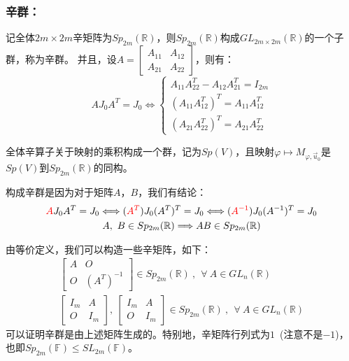 \documentclass[zihao=-4,UTF8]{report}
\theoremstyle{mystyle} %
\begin{document}
\subsubsection{辛群：}
记全体$2m\times 2m$辛矩阵为$Sp_{2m}(\mathbb{R})$，则$Sp_{2m}(\mathbb{R})$构成$GL_{2m\times 2m}(\mathbb{R})$的一个子群，称为辛群。
并且，设$A = \begin{bmatrix}
    A_{11}&A_{12}\\
    A_{21}&A_{22}
\end{bmatrix}$，则有：
\begin{equation*}
    AJ_0A^T = J_0  \Longleftrightarrow \begin{cases}
        A_{11}A_{22}^T - A_{12}A_{21}^T = I_{2m}\\
        (A_{11}A_{12}^T)^T = A_{11}A_{12}^T\\
        (A_{21}A_{22}^T)^T = A_{21}A_{22}^T
    \end{cases}
\end{equation*}\par
全体辛算子关于映射的乘积构成一个群，记为$Sp(V)$，且映射$\varphi \longmapsto M_{\varphi,\vec{u}_0}$是$Sp(V)$到$Sp_{2m}(\mathbb{R})$的同构。
{\par\color{gray}\small
构成辛群是因为对于矩阵$A$，$B$，我们有结论：
\begin{gather*}
    \textcolor{red}{A}J_0A^T = J_0 \Longleftrightarrow (\textcolor{red}{A^T})J_0(A^T)^T = J_0 \Longleftrightarrow (\textcolor{red}{A^{-1}})J_0(A^{-1})^T = J_0\\
    A,\ B \in Sp_{2m}(\mathbb{R})\Longrightarrow AB \in Sp_{2m}(\mathbb{R})
\end{gather*}\par 
\par}
{\par\color{gray}\small
由等价定义，我们可以构造一些辛矩阵，如下：
\begin{gather*}
    \begin{bmatrix}
        A  & O\\
        O & (A^T)^{-1}
    \end{bmatrix} \in Sp_{2m}(\mathbb{R})\ ,\ \  \forall\ A \in GL_n(\mathbb{R})\\
    \begin{bmatrix}
        I_m & A\\
        O & I_m
    \end{bmatrix},\ 
    \begin{bmatrix}
        I_m & A\\
        O & I_m
    \end{bmatrix} \in Sp_{2m}(\mathbb{R})\ ,\ \  \forall\ A \in GL_n(\mathbb{R}) 
\end{gather*}
可以证明辛群是由上述矩阵生成的。特别地，辛矩阵行列式为$1$\ (注意不是$-1$)，也即$Sp_{2m}(\mathbb{F}) \le SL_{2m}(\mathbb{F})$。
\par}
\end{document}
